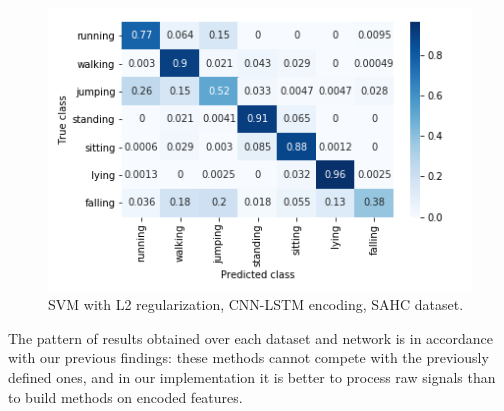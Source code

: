 \begin{figure}
    \centering
    \includegraphics[width=\columnwidth]{images/plot-cm-SVM-L2-SAHC_Mixed.png}
    \caption{SVM with L2 regularization, CNN-LSTM encoding, SAHC dataset.}
    \label{fig:cm-svm-sahc-mixed}
\end{figure}

The pattern of results obtained over each dataset and network is in accordance with our previous findings: these methods cannot compete with the previously defined ones, and in our implementation it is better to process raw signals than to build methods on encoded features.
